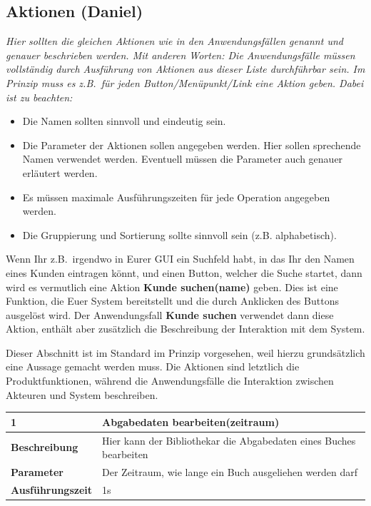 \documentclass[fontsize=12pt,paper=a4,twoside]{scrartcl}
\begin{document}
\subsection{Aktionen (Daniel)}
  {\em Hier sollten die gleichen Aktionen wie in den Anwendungsfällen
  genannt und genauer beschrieben werden. Mit anderen Worten: Die
  Anwendungsfälle müssen vollständig durch Ausführung von Aktionen aus
  dieser Liste durchführbar sein. Im Prinzip muss es z.B.\ für jeden
  Button/Menüpunkt/Link eine Aktion geben. Dabei ist zu beachten:
  \begin{itemize}
    \item Die Namen sollten sinnvoll und eindeutig sein.

    \item Die Parameter der Aktionen sollen angegeben werden. Hier
    sollen sprechende Namen verwendet werden. Eventuell müssen die
    Parameter auch genauer erläutert werden.

    \item Es müssen maximale Ausführungszeiten für jede Operation
    angegeben werden.
    
  \item Die Gruppierung und Sortierung sollte sinnvoll sein
    (z.B. alphabetisch).
  \end{itemize}

  Wenn Ihr z.B.\ irgendwo in Eurer GUI ein Suchfeld habt, in das Ihr
  den Namen eines Kunden eintragen könnt, und einen Button, welcher die
  Suche startet, dann wird es vermutlich eine Aktion {\bf Kunde
    suchen(name)} geben. Dies ist eine Funktion, die Euer System
  bereitstellt und die durch Anklicken des Buttons ausgelöst wird. Der
  Anwendungsfall {\bf Kunde suchen} verwendet dann diese Aktion,
  enthält aber zusätzlich die Beschreibung der Interaktion mit dem
  System.
  
  Dieser Abschnitt ist im Standard im Prinzip vorgesehen, weil hierzu
  grundsätzlich eine Aussage gemacht werden muss. Die Aktionen sind
  letztlich die Produktfunktionen, während die Anwendungsfälle die
  Interaktion zwischen Akteuren und System beschreiben. }

  \begin{table}[htbp]
  \label{a1}
  \begin{tabular}{|l|p{10cm}|}
  \hline 
  \textbf{1} & \textbf{Abgabedaten bearbeiten(zeitraum)} \\ \hline
  \textbf{Beschreibung} & Hier kann der Bibliothekar die Abgabedaten eines Buches bearbeiten\\ \hline
  \textbf{Parameter} & Der Zeitraum, wie lange ein Buch ausgeliehen werden darf\\ \hline
  \textbf{Ausführungszeit} & 1s\\ \hline
  \end{tabular}
  \end{table}
  
\end{document}
